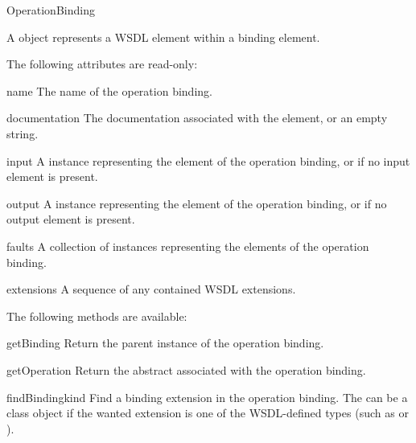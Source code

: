 \begin{classdesc}{OperationBinding}{}

A  object represents a WSDL  
element within a binding element.

The following attributes are read-only:

\begin{memberdesc}{name}
The name of the operation binding.
\end{memberdesc}

\begin{memberdesc}{documentation}
The documentation associated with the element, or an empty string.
\end{memberdesc}

\begin{memberdesc}{input}
A  instance representing the  
element of the operation binding, or  if no input element is 
present.
\end{memberdesc}

\begin{memberdesc}{output}
A  instance representing the  
element of the operation binding, or  if no output element is 
present.
\end{memberdesc}

\begin{memberdesc}{faults}
A collection of  instances representing the 
 elements of the operation binding.
\end{memberdesc}

\begin{memberdesc}{extensions}
A sequence of any contained WSDL extensions.
\end{memberdesc}

The following methods are available:

\begin{methoddesc}{getBinding}{}
Return the parent  instance of the operation binding.
\end{methoddesc}

\begin{methoddesc}{getOperation}{}
Return the abstract  associated with the operation binding.
\end{methoddesc}

\begin{methoddesc}{findBinding}{kind}
Find a binding extension in the operation binding. The  can be a 
class object if the wanted extension is one of the WSDL-defined types (such 
as  or ). 


\end{methoddesc}
\end{classdesc}
